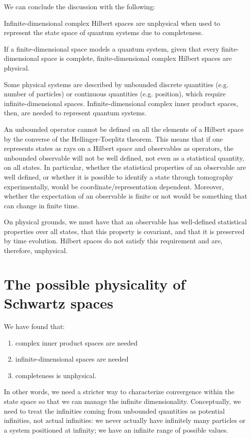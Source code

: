 \documentclass[10pt,twocolumn, nofootinbib]{revtex4-2}
\begin{document}
We can conclude the discussion with the following:
\begin{prop}
Infinite-dimensional complex Hilbert spaces are unphysical when used to represent the state space of quantum systems due to completeness.
\end{prop}
\begin{justification}
If a finite-dimensional space models a quantum system, given that every finite-dimensional space is complete, finite-dimensional complex Hilbert spaces are physical.

Some physical systems are described by unbounded discrete quantities (e.g. number of particles) or continuous quantities (e.g. position), which require infinite-dimensional spaces. Infinite-dimensional complex inner product spaces, then, are needed to represent quantum systems.

An unbounded operator cannot be defined on all the elements of a Hilbert space by the converse of the Hellinger-Toeplitz theorem. This means that if one represents states as rays on a Hilbert space and observables as operators, the unbounded observable will not be well defined, not even as a statistical quantity, on all states. In particular, whether the statistical properties of an observable are well defined, or whether it is possible to identify a state through tomography experimentally, would be coordinate/representation dependent. Moreover, whether the expectation of an observable is finite or not would be something that can change in finite time.

On physical grounds, we must have that an observable has well-defined statistical properties over all states, that this property is covariant, and that it is preserved by time evolution. Hilbert spaces do not satisfy this requirement and are, therefore, unphysical.
\end{justification}

\section{The possible physicality of Schwartz spaces}

We have found that:
\begin{enumerate}
\item complex inner product spaces are needed
\item infinite-dimensional spaces are needed
\item completeness is unphysical.
\end{enumerate}
In other words, we need a stricter way to characterize convergence within the state space so that we can manage the infinite dimensionality. Conceptually, we need to treat the infinities coming from unbounded quantities as potential infinities, not actual infinities: we never actually have infinitely many particles or a system positioned at infinity; we have an infinite range of possible values.
\end{document}
